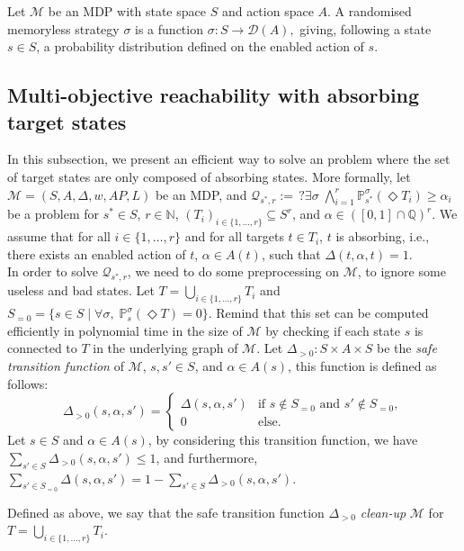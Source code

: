\begin{definition}
  Let \sloppy$\mathcal{M}$ be an MDP with state space $S$ and action space $A$. A randomised memoryless strategy $\sigma$ is a function
  $
    \sigma: S \rightarrow \mathcal{D}(A),
  $ giving, following a state $s \in S$, a probability distribution defined on the enabled action of $s$.
\end{definition}

\subsection{Multi-objective reachability with absorbing target \sloppy states} \label{MOSR-absorbing}

In this subsection, we present an efficient way to solve an \MOSR{} problem where the set of target states are only composed of absorbing states. More formally, let $\mathcal{M}=(S, A, \Delta, w, AP, L)$ be an MDP, and
$
  \mathcal{Q}_{s^*, r} := \,?\exists \sigma\; \bigwedge_{i=1}^r \mathbb{P}^\sigma_{s^*}(\Diamond T_i) \geq \alpha_i
$
be a \MOSR{} problem for $s^* \in S$, $r \in \mathbb{N}$, $(T_i)_{i \in \{1, \dots, r\}} \subseteq S^r$, and $\alpha \in ([0, 1] \cap \mathbb{Q})^r$.
We assume that for all $i \in \{ 1, \dots, r\}$ and for all targets $t \in T_i$, $t$ is absorbing, i.e., there exists an enabled action of $t$, $\alpha \in A(t)$, such that $\Delta(t, \alpha, t) = 1$.\\

In order to solve $\mathcal{Q}_{s^*, r}$, we need to do some preprocessing on $\mathcal{M}$, to ignore some useless and bad states.
Let $T = \bigcup_{i \in \{1, \dots, r\}} T_i$ and $S_{=0} = \{s \in S \; | \; \forall \sigma, \; \mathbb{P}_{s}^\sigma(\Diamond T) = 0\}$.
  Remind that this set can be computed efficiently in polynomial time in the size of $\mathcal{M}$ by checking if each state $s$ is connected to $T$ in the underlying graph of $\mathcal{M}$.
Let $\Delta_{>0} : S \times A \times S$ be the \textit{safe transition function} of $\mathcal{M}$, $s, s' \in S$, and $\alpha \in A(s)$, this function is defined as follows:
  \[
    \Delta_{>0}(s, \alpha, s') = \begin{cases}
      \Delta(s, \alpha, s') &\text{if } s \not \in S_{=0} \text{ and } s' \not\in S_{=0}, \\
      0 &\text{else}.
    \end{cases}
  \]
  Let $s \in S$ and $\alpha \in A(s)$,
  by considering this transition function, we have \sloppy$\sum_{s' \in S} \Delta_{>0}(s, \alpha, s') \leq 1$, and furthermore,
      $\sum_{s' \in S_{=0}} \Delta(s, \alpha, s') =
      1 - \sum_{s' \in S} \Delta_{>0}(s, \alpha, s') $.
\begin{notation}
  Defined as above, we say that the safe transition function $\Delta_{>0}$ \textit{clean-up} $\mathcal{M}$ for $T = \bigcup_{i \in \{1, \dots, r\}} T_i$.
\end{notation}

